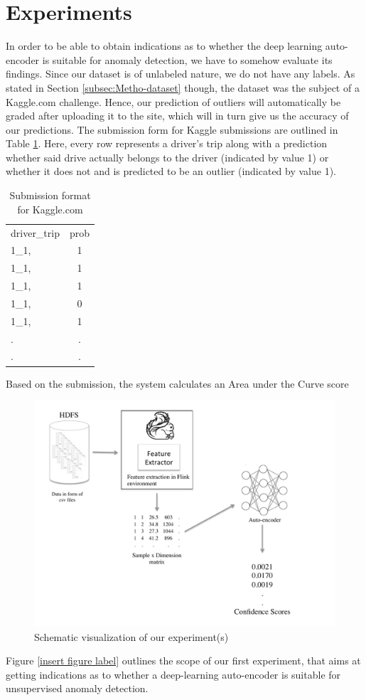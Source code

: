 \documentclass{vldb}
\begin{document}
\section{Experiments}
\label{sec:Experiments}
In order to be able to obtain indications as to whether the deep learning auto-encoder is suitable for anomaly detection, we have to somehow evaluate its findings. Since our dataset is of unlabeled nature, we do not have any labels. As stated in Section \ref{subsec:Metho-dataset} though, the dataset was the subject of a Kaggle.com challenge. Hence, our prediction of outliers will automatically be graded after uploading it to the site, which will in turn give us the accuracy of our predictions. The submission form for Kaggle submissions are outlined in Table \ref{table:kaggle-submission}. Here, every row represents a driver's trip along with a prediction whether said drive actually belongs to the driver (indicated by value 1) or whether it does not and is predicted to be an outlier (indicated by value 1).
\begin{table}
\centering
\begin{tabular}{l c}
driver\_trip & prob\\
1\_1,& 1\\
1\_1,& 1\\
1\_1,& 1\\
1\_1,& 0\\
1\_1,& 1\\
. & . \\
. & . \\
\end{tabular}
\caption{Submission format for Kaggle.com}
\label{table:kaggle-submission}
\end{table}
Based on the submission, the system calculates an Area under the Curve score 

\begin{figure}
\centering
\includegraphics[trim=1cm 0cm 1cm 0.5cm, clip=true, width=1.2\linewidth]{"pics/approach2"}
\caption{Schematic visualization of our experiment(s)}
\label{fig:approach-2}
\end{figure}
Figure \ref{insert figure label} outlines the scope of our first experiment, that aims at getting indications as to whether a deep-learning auto-encoder is suitable for unsupervised anomaly detection.
\end{document}
